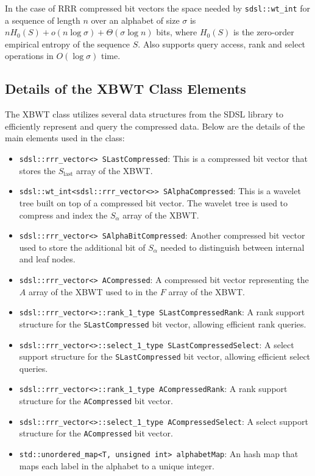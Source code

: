 In the case of RRR compressed bit vectors the space needed by \texttt{sdsl::wt\_int} for a sequence of length $n$ over an alphabet of size $\sigma$ is $nH_0(S) + o(n \log \sigma) + \Theta(\sigma \log n)$ bits, where $H_0(S)$ is the zero-order empirical entropy of the sequence $S$. Also supports query access, rank and select operations in $O(\log \sigma)$ time.

\subsection{Details of the XBWT Class Elements}
The XBWT class utilizes several data structures from the SDSL library to efficiently represent and query the compressed data. Below are the details of the main elements used in the class:

\begin{itemize}
    \item \texttt{sdsl::rrr\_vector<> SLastCompressed}: This is a compressed bit vector that stores the $S_{\text{last}}$ array of the XBWT. 
    \item \texttt{sdsl::wt\_int<sdsl::rrr\_vector<>> SAlphaCompressed}: This is a wavelet tree built on top of a compressed bit vector. The wavelet tree is used to compress and index the $S_{\alpha}$ array of the XBWT.
    \item \texttt{sdsl::rrr\_vector<> SAlphaBitCompressed}: Another compressed bit vector used to store the additional bit of $S_{\alpha}$ needed to distinguish between internal and leaf nodes.
    \item \texttt{sdsl::rrr\_vector<> ACompressed}: A compressed bit vector representing the $A$ array of the XBWT used to in the $F$ array of the XBWT.
    \item \texttt{sdsl::rrr\_vector<>::rank\_1\_type SLastCompressedRank}: A rank support structure for the \texttt{SLastCompressed} bit vector, allowing efficient rank queries.
    \item \texttt{sdsl::rrr\_vector<>::select\_1\_type SLastCompressedSelect}: A select support structure for the \texttt{SLastCompressed} bit vector, allowing efficient select queries.
    \item \texttt{sdsl::rrr\_vector<>::rank\_1\_type ACompressedRank}: A rank support structure for the \texttt{ACompressed} bit vector.
    \item \texttt{sdsl::rrr\_vector<>::select\_1\_type ACompressedSelect}: A select support structure for the \texttt{ACompressed} bit vector.
    \item \texttt{std::unordered\_map<T, unsigned int> alphabetMap}: An hash map that maps each label in the alphabet to a unique integer.

\end{itemize}
